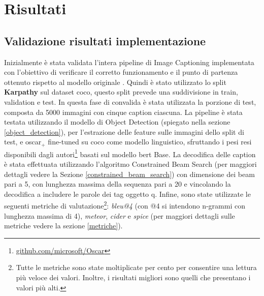 \chapter{Risultati}
\section{Validazione risultati implementazione}
Inizialmente è stata validata l'intera pipeline di Image Captioning implementata con l'obiettivo di verificare il corretto funzionamento e il punto di partenza ottenuto rispetto al modello originale \cite{li2020oscar, zhang2021vinvl}.
Quindi è stato utilizzato lo split \textbf{Karpathy} \cite{karpathy2015deep} sul dataset \acrshort{coco}, questo split prevede una suddivisione in train, validation e test. In questa fase di convalida è stata utilizzata la porzione di test, composta da 5000 immagini con cinque caption ciascuna.
La pipeline è stata testata utilizzando il modello di Object Detection (spiegato nella sezione \ref{object_detection}), per l'estrazione delle feature sulle immagini dello split di test, e \acrshort{oscar}$_+$ fine-tuned su \acrshort{coco} come modello linguistico, sfruttando i pesi resi disponibili dagli autori\footnote{\url{github.com/microsoft/Oscar}} basati sul modello \acrshort{bert} Base.
La decodifica delle caption è stata effettuata utilizzando l'algoritmo Constrained Beam Search (per maggiori dettagli vedere la Sezione \ref{constrained_beam_search}) con dimensione dei beam pari a 5, con lunghezza massima della sequenza pari a 20 e vincolando la decodifica a includere le parole dei tag oggetto q.
Infine, sono state utilizzate le seguenti metriche di valutazione\footnote{Tutte le metriche sono state moltiplicate per cento per consentire una lettura più veloce dei valori. Inoltre, i risultati migliori sono quelli che presentano i valori più alti.}: \textit{\acrshort{bleu}@4} (con @4 si intendono n-grammi con lunghezza massima di 4), \textit{\acrshort{meteor}}, \textit{\acrshort{cider}} e \textit{\acrshort{spice}} (per maggiori dettagli sulle metriche vedere la sezione \ref{metriche}).
